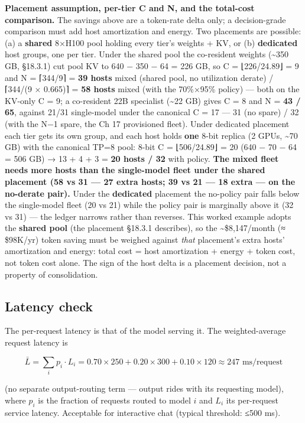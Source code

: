 \textbf{Placement assumption, per-tier C and N, and the total-cost
comparison.} The savings above are a token-rate delta only; a
decision-grade comparison must add host amortization and energy. Two
placements are possible: (a) a \textbf{shared} 8×H100 pool holding every
tier's weights + KV, or (b) \textbf{dedicated} host groups, one per
tier. Under the shared pool the co-resident weights (\textasciitilde350
GB, §18.3.1) cut pool KV to 640 − 350 − 64 = 226 GB, so C = ⌊226/24.89⌋
= 9 and N = ⌈344/9⌉ = \textbf{39 hosts} mixed (shared pool, no
utilization derate) / ⌈344/(9 × 0.665)⌉ = \textbf{58 hosts} mixed (with
the 70\%×95\% policy) --- both on the KV-only C = 9; a co-resident 22B
specialist (\textasciitilde22 GB) gives C = 8 and N = \textbf{43 / 65},
against 21/31 single-model under the canonical C = 17 --- 31 (no spare)
/ 32 (with the N−1 spare, the Ch 17 provisioned fleet). Under dedicated
placement each tier gets its own group, and each host holds \textbf{one}
8-bit replica (2 GPUs, \textasciitilde70 GB) with the canonical TP=8
pool: 8-bit C = ⌊506/24.89⌋ = 20 (640 − 70 − 64 = 506 GB) → 13 + 4 + 3 =
\textbf{20 hosts / 32} with policy. \textbf{The mixed fleet needs more
hosts than the single-model fleet under the shared placement (58 vs 31
--- 27 extra hosts; 39 vs 21 --- 18 extra --- on the no-derate pair).}
Under the \textbf{dedicated} placement the no-policy pair falls below
the single-model fleet (20 vs 21) while the policy pair is marginally
above it (32 vs 31) --- the ledger narrows rather than reverses. This
worked example adopts the \textbf{shared pool} (the placement §18.3.1
describes), so the \textasciitilde\$8,147/month (≈ \$98K/yr) token
saving must be weighed against \emph{that} placement's extra hosts'
amortization and energy: total cost = host amortization + energy + token
cost, not token cost alone. The sign of the host delta is a placement
decision, not a property of consolidation.

\subsection{Latency check}\label{latency-check}

The per-request latency is that of the model serving it. The
weighted-average request latency is

\[
\bar{L} = \sum_i p_i \cdot L_i = 0.70 \times 250 + 0.20 \times 300 + 0.10 \times 120 \approx 247 \text{ ms/request}
\]

(no separate output-routing term --- output rides with its requesting
model), where \(p_i\) is the fraction of requests routed to model \(i\)
and \(L_i\) its per-request service latency. Acceptable for interactive
chat (typical threshold: ≤500 ms).

